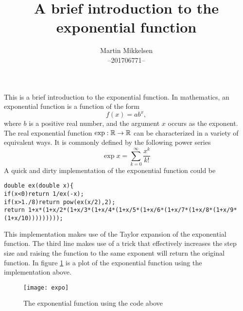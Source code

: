 


	\author{Martin Mikkelsen  \\
		--201706771-- \\ }
	\title{A brief introduction to the exponential function}
	\maketitle



	\thispagestyle{firststyle}

This is a brief introduction to the exponential function. In mathematics, an exponential function is a function of the form
\begin{equation} \label{def}
  f(x)=ab^x,
\end{equation}
where $b$ is a positive real number, and the argument $x$  occurs as the exponent. The real exponential function $\exp:\mathbb{R} \rightarrow \mathbb{R}$ can be characterized in a variety of equivalent ways. It is commonly defined by the following power series
\begin{equation}
  \exp{x} = \sum_{k=0}^{\infty} \frac{x^k}{k!}
\end{equation}
A quick and dirty implementation of the exponential function could be
\begin{lstlisting}
double ex(double x){
if(x<0)return 1/ex(-x);
if(x>1./8)return pow(ex(x/2),2);
return 1+x*(1+x/2*(1+x/3*(1+x/4*(1+x/5*(1+x/6*(1+x/7*(1+x/8*(1+x/9*(1+x/10)))))))));
\end{lstlisting}
This implementation makes use of the Taylor expansion of the exponential function. The third line makes use of a trick that effectively increases the step size and raising the function to the same exponent will return the original function.
In figure \ref{Expo} is a plot of the exponential function using the implementation above.
\begin{figure}[H]
  \centering
  \texttt{[image: expo]}
  \caption{The exponential function using the code above}
  \label{Expo}
\end{figure}

